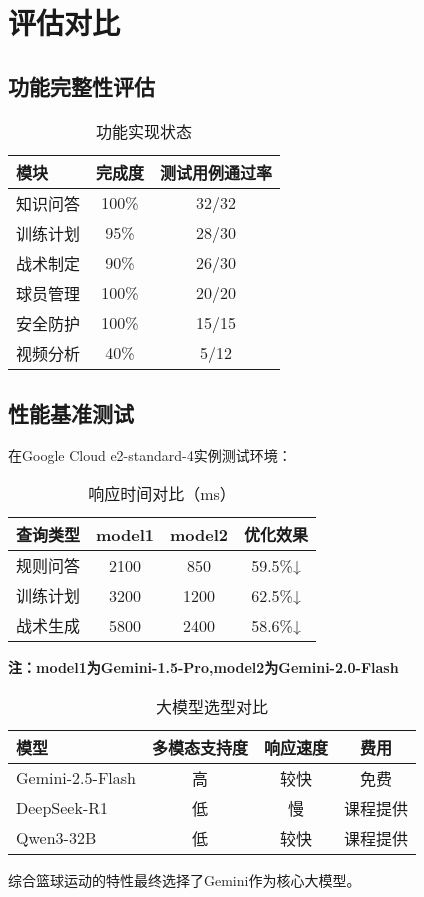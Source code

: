 \documentclass{article}
\theoremstyle{plain}
\theoremstyle{definition}
\theoremstyle{remark}
\begin{document}
\section{评估对比}

\subsection{功能完整性评估}
\begin{table}[h]
\caption{功能实现状态}
\label{feature-status}
\centering
\begin{tabular}{lcc}
\toprule
模块 & 完成度 & 测试用例通过率 \\
\midrule
知识问答 & 100\% & 32/32 \\
训练计划 & 95\% & 28/30 \\
战术制定 & 90\% & 26/30 \\
球员管理 & 100\% & 20/20 \\
安全防护 & 100\% & 15/15 \\
视频分析 & 40\% & 5/12 \\
\bottomrule
\end{tabular}
\end{table}

\subsection{性能基准测试}
在Google Cloud e2-standard-4实例测试环境：
\begin{table}[h]
\caption{响应时间对比（ms）}
\label{performance}
\centering
\begin{tabular}{lccc}
\toprule
查询类型 & model1 & model2 & 优化效果 \\
\midrule
规则问答 & 2100 & 850 & 59.5\%↓ \\
训练计划 & 3200 & 1200 & 62.5\%↓ \\
战术生成 & 5800 & 2400 & 58.6\%↓ \\
\bottomrule
\end{tabular}
\end{table}
\newline
\textbf{注：model1为Gemini-1.5-Pro,model2为Gemini-2.0-Flash}


\begin{table}[h]
\caption{大模型选型对比}
\label{model-selection}
\centering
\begin{tabular}{lccc}
\toprule
模型 & 多模态支持度 & 响应速度 & 费用 \\
\midrule
Gemini-2.5-Flash & 高 & 较快 & 免费 \\
DeepSeek-R1 & 低 & 慢 & 课程提供 \\
Qwen3-32B & 低 & 较快 & 课程提供\\
\bottomrule
\end{tabular}
\end{table}
综合篮球运动的特性最终选择了Gemini作为核心大模型。
\end{document}
